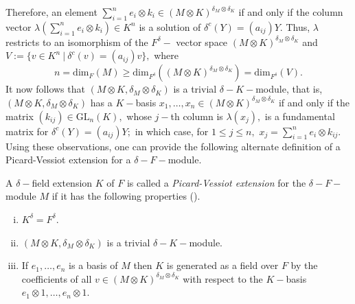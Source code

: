 \documentclass[preprint, 11pt]{amsart}
\theoremstyle{corollary}
\theoremstyle{remark}
\theoremstyle{proposition}
\numberwithin{equation}{subsection}
\begin{document}
Therefore, an element $\sum^n_{i=1}e_i\otimes k_i\in (M\otimes K)^{\delta_M\otimes \delta_K}$ if and only if the column vector $\lambda(\sum^n_{i=1}e_i\otimes k_i)\in K^n$ is a solution of $\delta^c(Y)=(a_{ij})Y.$ Thus, $\lambda$ restricts to an isomorphism of the $F^{\delta}-$ vector space $(M\otimes K)^{\delta_M\otimes \delta_K}$ and $V:=\{v\in K^n\ | \ \delta^c(v)=(a_{ij})v\},$ where $$n= \mathrm{dim}_F(M)\geq \mathrm{dim}_{F^\delta}\left((M\otimes K)^{\delta_M\otimes \delta_K}\right)= \mathrm{dim}_{F^{\delta}}(V).$$
It now follows that $(M\otimes K, \delta_M\otimes \delta_K)$ is a trivial $\delta-K-$module, that is, $(M\otimes K, \delta_M\otimes \delta_K)$ has  a $K-$basis $x_1,\dots, x_n\in (M\otimes K)^{\delta_M\otimes \delta_K}$ if and only if the matrix $(k_{ij})\in \mathrm{GL}_n(K),$ whose $j-$th column is $\lambda(x_j),$ is a fundamental matrix for $\delta^c(Y)=(a_{ij})Y;$ in which case, for $1\leq j\leq n,$ $x_j=\sum^n_{i=1} e_i\otimes k_{ij}.$   Using these observations, one can provide the following alternate definition of a Picard-Vessiot extension for a $\delta-F-$module.

A  $\delta-$field extension $K$ of $F$ is called a \emph{Picard-Vessiot extension}  for the $\delta-F-$module $M$ if it has the following properties  (\cite[Exersice 1.16]{MvdP03}).
\begin{enumerate}[(i)] \item  $K^\delta=F^{\delta}.$ 
	\item \label{muisomorphism} $(M\otimes K, \delta_M\otimes\delta_K)$ is a trivial  $\delta-K-$module.
	\item \label{generation}If $e_1,\dots, e_n$ is a basis of $M$ then $K$ is generated as a field over $F$ by the coefficients of all $v\in (M\otimes K)^{\delta_M\otimes \delta_K}$ with respect to the $K-$basis $e_1\otimes 1, \dots, e_n\otimes 1.$
\end{enumerate}
\end{document}

